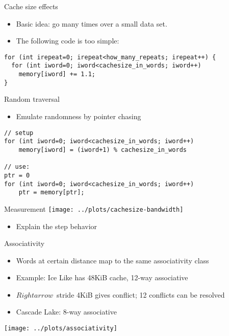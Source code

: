 \begin{numberedframe}{Cache size effects}
  \begin{itemize}
  \item Basic idea: go many times over a small data set.
  \item The following code is too simple:
  \end{itemize}
\begin{lstlisting}
for (int irepeat=0; irepeat<how_many_repeats; irepeat++) {
  for (int iword=0; iword<cachesize_in_words; iword++)
    memory[iword] += 1.1;
}    
\end{lstlisting}
\end{numberedframe}

\begin{numberedframe}{Random traversal}
  \begin{itemize}
  \item Emulate randomness by pointer chasing
  \end{itemize}
\begin{lstlisting}
// setup
for (int iword=0; iword<cachesize_in_words; iword++)
    memory[iword] = (iword+1) % cachesize_in_words

// use:
ptr = 0
for (int iword=0; iword<cachesize_in_words; iword++)
    ptr = memory[ptr];
\end{lstlisting}
\end{numberedframe}

\begin{numberedframe}{Measurement}
  \texttt{[image: ../plots/cachesize-bandwidth]}
  \begin{itemize}
  \item Explain the step behavior
  \end{itemize}
\end{numberedframe}

\begin{numberedframe}{Associativity}
  \begin{itemize}
  \item Words at certain distance map to the same associativity class
  \item Example: Ice Like has 48KiB cache, 12-way associative
  \item $Rightarrow$~stride 4KiB gives conflict; 12 conflicts can be resolved
  \item Cascade Lake: 8-way associative
  \end{itemize}
\texttt{[image: ../plots/associativity]}
\end{numberedframe}

